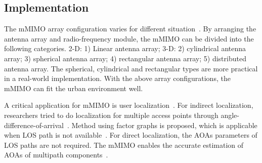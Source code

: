 \documentclass[12pt]{article}
\begin{document}
\subsection{Implementation}
The mMIMO array configuration varies for different situation~\cite{riadi2017overview}. By arranging the antenna array and radio-frequency module, the mMIMO can be divided into the following categories. 2-D: 1) Linear antenna array; 3-D: 2) cylindrical antenna array; 3) spherical antenna array; 4) rectangular antenna array; 5) distributed antenna array. The spherical, cylindrical and rectangular types are more practical in a real-world implementation. With the above array configurations, the mMIMO can fit the urban environment well.

A critical application for mMIMO is user localization~\cite{wen2019survey}. For indirect localization, researchers tried to do localization for multiple access points through angle-difference-of-arrival~\cite{palacios2017jade}. Method using factor graphs is proposed, which is applicable when LOS path is not available~\cite{mendrzik2018joint}. For direct localization, the AOAs parameters of LOS paths are not required. The mMIMO enables the accurate estimation of AOAs of multipath components~\cite{hu2014esprit}.



\newpage


\end{document}
